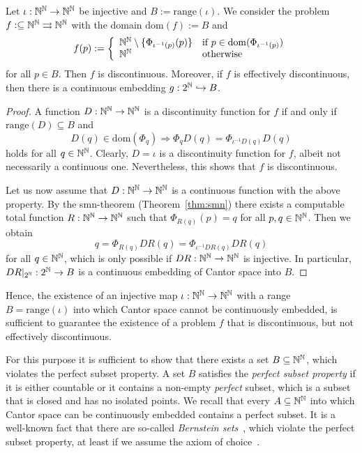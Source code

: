 \documentclass{amsart}
\def\IN{{\Bbb{N}}}
\def\TO{\Longrightarrow}
\def\In{\subseteq}
\def\into{\hookrightarrow}
\def\mto{\rightrightarrows}
\def\dom{{\mathrm{dom}}}
\def\range{{\mathrm{range}}}
\begin{document}
\begin{proposition}
\label{prop:embedding-effectively-discontinuous}
Let $\iota:\IN^\IN\to\IN^\IN$ be injective and $B:=\range(\iota)$. We consider the problem
$f:\In\IN^\IN\mto\IN^\IN$ with the domain $\dom(f):=B$ and
\[f(p):=\left\{\begin{array}{ll}
\IN^\IN\setminus\{\Phi_{\iota^{-1}(p)}(p)\} & \mbox{if $p\in\dom(\Phi_{\iota^{-1}(p)})$}\\
\IN^\IN & \mbox{otherwise}
\end{array}\right.\]
for all $p\in B$. Then $f$ is discontinuous. Moreover, if $f$ is effectively discontinuous, then there is a continuous
embedding $g:2^\IN\into B$.
\end{proposition}
\begin{proof}
A function $D:\IN^\IN\to\IN^\IN$ is a discontinuity function for $f$ if and only if $\range(D)\In B$ and
\[D(q)\in\dom(\Phi_q)\TO\Phi_qD(q)=\Phi_{\iota^{-1}D(q)}D(q)\]
holds for all $q\in\IN^\IN$. Clearly, $D=\iota$ is a discontinuity function
for $f$, albeit not necessarily a continuous one. Nevertheless, this shows that $f$ is discontinuous.

Let us now assume that $D:\IN^\IN\to\IN^\IN$ is a continuous function with the above property. 
By the smn-theorem (Theorem~\ref{thm:smn}) there exists a computable total function $R:\IN^\IN\to\IN^\IN$ such that
$\Phi_{R(q)}(p)=q$ for all $p,q\in\IN^\IN$. Then we obtain 
\[q=\Phi_{R(q)}DR(q)=\Phi_{\iota^{-1}DR(q)}DR(q)\]
for all $q\in\IN^\IN$, which is only possible if $DR:\IN^\IN\to\IN^\IN$ is injective.
In particular, $DR|_{2^\IN}:2^\IN\to B$ is a continuous embedding of Cantor space into $B$.
\end{proof}

Hence, the existence of an injective map $\iota:\IN^\IN\to\IN^\IN$ with a range $B=\range(\iota)$
into which Cantor space cannot be continuously embedded, is sufficient to guarantee the existence
of a problem $f$ that is discontinuous, but not effectively discontinuous.

For this purpose it is sufficient to show that there exists a set $B\In\IN^\IN$, which violates the perfect subset property.
A set $B$ satisfies the {\em perfect subset property} if it is either countable or it contains a non-empty {\em perfect} subset, which
is a subset that is closed and has no isolated points. We recall that every $A\In\IN^\IN$ into which Cantor space can be continuously embedded contains a perfect subset.
It is a well-known fact that there are so-called {\em Bernstein sets}~\cite{Ber08a}, which violate the perfect subset property,
at least if we assume the axiom of choice~\cite[Exercise~8.24]{Kec95}.
\end{document}
